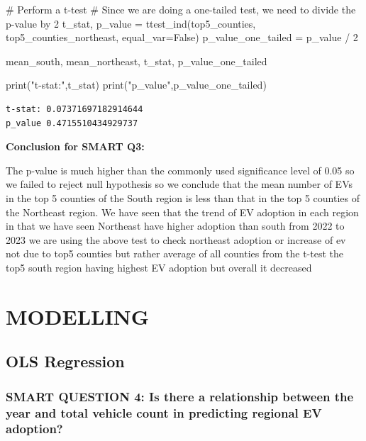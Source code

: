 \documentclass[
  letterpaper,
  DIV=11,
  numbers=noendperiod]{scrartcl}
\newenvironment{Shaded}{\begin{snugshade}}{\end{snugshade}}
\newcommand{\BuiltInTok}[1]{\textcolor[rgb]{0.00,0.23,0.31}{#1}}
\newcommand{\CommentTok}[1]{\textcolor[rgb]{0.37,0.37,0.37}{#1}}
\newcommand{\DecValTok}[1]{\textcolor[rgb]{0.68,0.00,0.00}{#1}}
\newcommand{\NormalTok}[1]{\textcolor[rgb]{0.00,0.23,0.31}{#1}}
\newcommand{\OperatorTok}[1]{\textcolor[rgb]{0.37,0.37,0.37}{#1}}
\newcommand{\StringTok}[1]{\textcolor[rgb]{0.13,0.47,0.30}{#1}}
\newcommand{\VariableTok}[1]{\textcolor[rgb]{0.07,0.07,0.07}{#1}}
\begin{document}
\begin{Shaded}
\begin{Highlighting}[]
\CommentTok{\# Perform a t{-}test}
\CommentTok{\# Since we are doing a one{-}tailed test, we need to divide the p{-}value by 2}
\NormalTok{t\_stat, p\_value }\OperatorTok{=}\NormalTok{ ttest\_ind(top5\_counties, top5\_counties\_northeast, equal\_var}\OperatorTok{=}\VariableTok{False}\NormalTok{)}
\NormalTok{p\_value\_one\_tailed }\OperatorTok{=}\NormalTok{ p\_value }\OperatorTok{/} \DecValTok{2}

\NormalTok{mean\_south, mean\_northeast, t\_stat, p\_value\_one\_tailed }

\BuiltInTok{print}\NormalTok{(}\StringTok{"t{-}stat:"}\NormalTok{,t\_stat)}
\BuiltInTok{print}\NormalTok{(}\StringTok{"p\_value"}\NormalTok{,p\_value\_one\_tailed)}
\end{Highlighting}
\end{Shaded}

\begin{verbatim}
t-stat: 0.07371697182914644
p_value 0.4715510434929737
\end{verbatim}

\textbf{Conclusion for SMART Q3:}

The p-value is much higher than the commonly used significance level of
0.05 so we failed to reject null hypothesis so we conclude that the mean
number of EVs in the top 5 counties of the South region is less than
that in the top 5 counties of the Northeast region. We have seen that
the trend of EV adoption in each region in that we have seen Northeast
have higher adoption than south from 2022 to 2023 we are using the above
test to check northeast adoption or increase of ev not due to top5
counties but rather average of all counties from the t-test the top5
south region having highest EV adoption but overall it decreased

\hypertarget{modelling}{%
\section{MODELLING}\label{modelling}}

\hypertarget{ols-regression}{%
\subsection{OLS Regression}\label{ols-regression}}

\hypertarget{smart-question-4-is-there-a-relationship-between-the-year-and-total-vehicle-count-in-predicting-regional-ev-adoption}{%
\subsubsection{SMART QUESTION 4: Is there a relationship between the
year and total vehicle count in predicting regional EV
adoption?}\label{smart-question-4-is-there-a-relationship-between-the-year-and-total-vehicle-count-in-predicting-regional-ev-adoption}}
\end{document}
